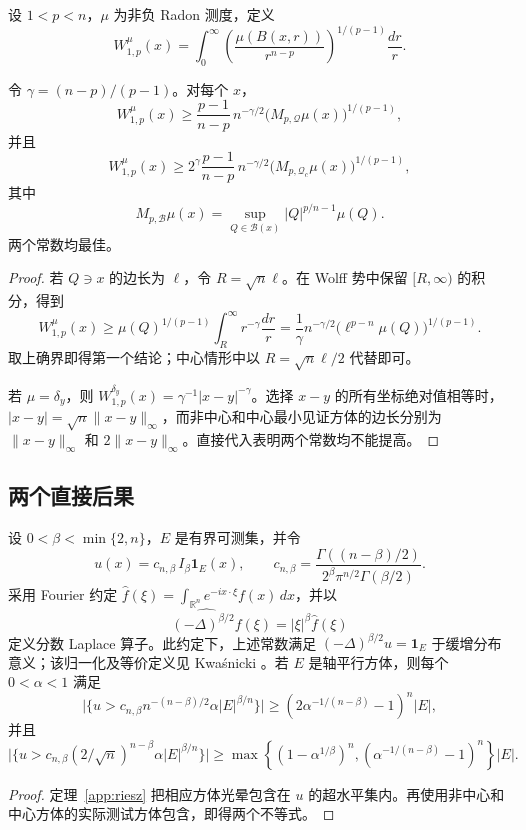 设 $1<p<n$，$\mu$ 为非负 Radon 测度，定义
\[
 W_{1,p}^{\mu}(x)=\int_0^\infty
 \left(\frac{\mu(B(x,r))}{r^{n-p}}\right)^{1/(p-1)}\frac{dr}{r}.
\]

\begin{theorem}\label{app:wolff}
令 $\gamma=(n-p)/(p-1)$。对每个 $x$，
\[
 W_{1,p}^{\mu}(x)\ge
 \frac{p-1}{n-p}\,n^{-\gamma/2}
 \bigl(M_{p,\mathcal Q}\mu(x)\bigr)^{1/(p-1)},
\]
并且
\[
 W_{1,p}^{\mu}(x)\ge
 2^\gamma\frac{p-1}{n-p}\,n^{-\gamma/2}
 \bigl(M_{p,\mathcal Q_c}\mu(x)\bigr)^{1/(p-1)},
\]
其中
\[
 M_{p,\mathcal B}\mu(x)=
 \sup_{Q\in\mathcal B(x)}|Q|^{p/n-1}\mu(Q).
\]
两个常数均最佳。
\end{theorem}
\begin{proof}
若 $Q\ni x$ 的边长为 $\ell$，令 $R=\sqrt n\ell$。在 Wolff 势中保留 $[R,\infty)$ 的积分，得到
\[
 W_{1,p}^{\mu}(x)\ge
 \mu(Q)^{1/(p-1)}\int_R^\infty r^{-\gamma}\frac{dr}{r}
 =\frac1\gamma n^{-\gamma/2}
 \bigl(\ell^{p-n}\mu(Q)\bigr)^{1/(p-1)}.
\]
取上确界即得第一个结论；中心情形中以 $R=\sqrt n\ell/2$ 代替即可。

若 $\mu=\delta_y$，则 $W_{1,p}^{\delta_y}(x)=\gamma^{-1}|x-y|^{-\gamma}$。选择 $x-y$ 的所有坐标绝对值相等时，$|x-y|=\sqrt n\|x-y\|_\infty$，而非中心和中心最小见证方体的边长分别为 $\|x-y\|_\infty$ 和 $2\|x-y\|_\infty$。直接代入表明两个常数均不能提高。
\end{proof}

\subsection{两个直接后果}

\begin{corollary}\label{app:fractional-laplace}
设 $0<\beta<\min\{2,n\}$，$E$ 是有界可测集，并令
\[
 u(x)=c_{n,\beta}\,I_\beta\mathbf1_E(x),\qquad
 c_{n,\beta}=\frac{\Gamma((n-\beta)/2)}{2^\beta\pi^{n/2}\Gamma(\beta/2)}.
\]
采用 Fourier 约定 $\widehat f(\xi)=\int_{\mathbb R^n}e^{-ix\cdot\xi}f(x)\,dx$，并以
\[
 \widehat{(-\Delta)^{\beta/2}f}(\xi)=|\xi|^\beta\widehat f(\xi)
\]
定义分数 Laplace 算子。此约定下，上述常数满足
$(-\Delta)^{\beta/2}u=\mathbf1_E$ 于缓增分布意义；该归一化及等价定义见 Kwa\'snicki \cite{Kwasnicki2017}。若 $E$ 是轴平行方体，则每个 $0<\alpha<1$ 满足
\[
 \bigl|\{u>c_{n,\beta}n^{-(n-\beta)/2}\alpha |E|^{\beta/n}\}\bigr|
 \ge (2\alpha^{-1/(n-\beta)}-1)^n|E|,
\]
并且
\[
 \bigl|\{u>c_{n,\beta}(2/\sqrt n)^{n-\beta}\alpha |E|^{\beta/n}\}\bigr|
 \ge \max\!\left\{(1-\alpha^{1/\beta})^n,
 (\alpha^{-1/(n-\beta)}-1)^n\right\}|E|.
\]
\end{corollary}
\begin{proof}
定理~\ref{app:riesz} 把相应方体光晕包含在 $u$ 的超水平集内。再使用非中心和中心方体的实际测试方体包含，即得两个不等式。
\end{proof}

